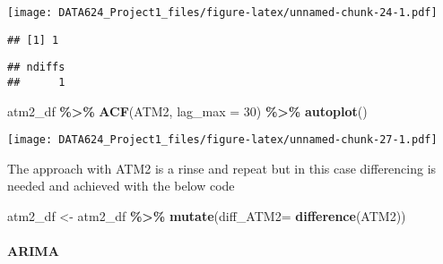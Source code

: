 \documentclass[
]{article}
\newenvironment{Shaded}{\begin{snugshade}}{\end{snugshade}}
\newcommand{\AttributeTok}[1]{\textcolor[rgb]{0.13,0.29,0.53}{#1}}
\newcommand{\DecValTok}[1]{\textcolor[rgb]{0.00,0.00,0.81}{#1}}
\newcommand{\FunctionTok}[1]{\textcolor[rgb]{0.13,0.29,0.53}{\textbf{#1}}}
\newcommand{\NormalTok}[1]{#1}
\newcommand{\OtherTok}[1]{\textcolor[rgb]{0.56,0.35,0.01}{#1}}
\newcommand{\SpecialCharTok}[1]{\textcolor[rgb]{0.81,0.36,0.00}{\textbf{#1}}}
\begin{document}
\texttt{[image: DATA624\_Project1\_files/figure-latex/unnamed-chunk-24-1.pdf]}

\begin{Shaded}
\end{Shaded}

\begin{verbatim}
## [1] 1
\end{verbatim}

\begin{Shaded}
\end{Shaded}

\begin{verbatim}
## ndiffs 
##      1
\end{verbatim}

\begin{Shaded}
\begin{Highlighting}[]
\NormalTok{atm2\_df }\SpecialCharTok{\%\textgreater{}\%} 
  \FunctionTok{ACF}\NormalTok{(ATM2, }\AttributeTok{lag\_max =} \DecValTok{30}\NormalTok{) }\SpecialCharTok{\%\textgreater{}\%} 
  \FunctionTok{autoplot}\NormalTok{()}
\end{Highlighting}
\end{Shaded}

\texttt{[image: DATA624\_Project1\_files/figure-latex/unnamed-chunk-27-1.pdf]}

The approach with ATM2 is a rinse and repeat but in this case
differencing is needed and achieved with the below code

\begin{Shaded}
\begin{Highlighting}[]
\NormalTok{atm2\_df }\OtherTok{\textless{}{-}}\NormalTok{ atm2\_df }\SpecialCharTok{\%\textgreater{}\%} 
  \FunctionTok{mutate}\NormalTok{(}\AttributeTok{diff\_ATM2=} \FunctionTok{difference}\NormalTok{(ATM2))}
\end{Highlighting}
\end{Shaded}

\hypertarget{arima-1}{%
\paragraph{ARIMA}\label{arima-1}}
\end{document}

